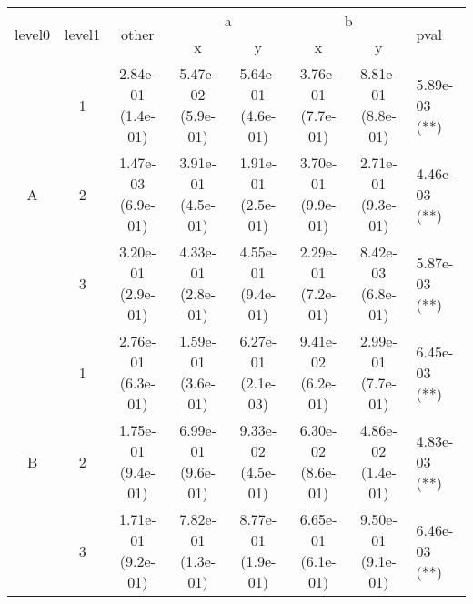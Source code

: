 \begin{tabular}{cccccccl}
\toprule
\multirow{2}{*}{level0} & \multirow{2}{*}{level1}& \multirow{2}{*}{other}&\multicolumn{2}{c}{a}&\multicolumn{2}{c}{b}& \multirow{2}{*}{pval}\tabularnewline
\cmidrule(lr){4-5}
\cmidrule(lr){6-7}
&&&x&y&x&y\tabularnewline
\midrule
\multirow{3}{*}{A}&1& 2.84e-01 (1.4e-01)& 5.47e-02 (5.9e-01)& 5.64e-01 (4.6e-01)& 3.76e-01 (7.7e-01)& 8.81e-01 (8.8e-01)& 5.89e-03 (**)\tabularnewline
&2& 1.47e-03 (6.9e-01)& 3.91e-01 (4.5e-01)& 1.91e-01 (2.5e-01)& 3.70e-01 (9.9e-01)& 2.71e-01 (9.3e-01)& 4.46e-03 (**)\tabularnewline
&3& 3.20e-01 (2.9e-01)& 4.33e-01 (2.8e-01)& 4.55e-01 (9.4e-01)& 2.29e-01 (7.2e-01)& 8.42e-03 (6.8e-01)& 5.87e-03 (**)\tabularnewline
\midrule
\multirow{3}{*}{B}&1& 2.76e-01 (6.3e-01)& 1.59e-01 (3.6e-01)& 6.27e-01 (2.1e-03)& 9.41e-02 (6.2e-01)& 2.99e-01 (7.7e-01)& 6.45e-03 (**)\tabularnewline
&2& 1.75e-01 (9.4e-01)& 6.99e-01 (9.6e-01)& 9.33e-02 (4.5e-01)& 6.30e-02 (8.6e-01)& 4.86e-02 (1.4e-01)& 4.83e-03 (**)\tabularnewline
&3& 1.71e-01 (9.2e-01)& 7.82e-01 (1.3e-01)& 8.77e-01 (1.9e-01)& 6.65e-01 (6.1e-01)& 9.50e-01 (9.1e-01)& 6.46e-03 (**)\tabularnewline
\bottomrule
\end{tabular}
